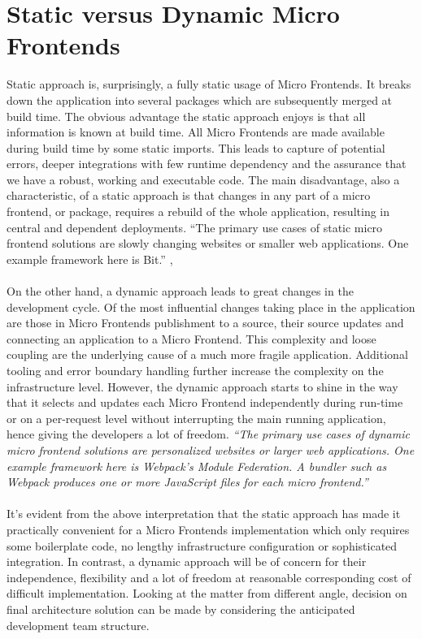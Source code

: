 \documentclass[a4paper]{book}
\begin{document}
\section{Static versus Dynamic Micro Frontends}
Static approach is, surprisingly, a fully static usage of Micro Frontends. It breaks down the application into several packages which are subsequently merged at build time. The obvious advantage the static approach enjoys is that all information is known at build time. All Micro Frontends are made available during build time by some static imports. This leads to capture of potential errors, deeper integrations with few runtime dependency and the assurance that we have a robust, working and executable code. The main disadvantage, also a characteristic, of a static approach is that changes in any part of a micro frontend, or package, requires a rebuild of the whole application, resulting in central and dependent deployments. “The primary use cases of static micro frontend solutions are slowly changing websites or smaller web applications. One example framework here is Bit.” \cite{Rap20}, \cite{Bit15}
\\
\\
On the other hand, a dynamic approach leads to great changes in the development cycle. Of the most influential changes taking place in the application are those in Micro Frontends publishment to a source, their source updates and connecting an application to a Micro Frontend. This complexity and loose coupling are the underlying cause of a much more fragile application. Additional tooling and error boundary handling further increase the complexity on the infrastructure level. However, the dynamic approach starts to shine in the way that it selects and updates each Micro Frontend independently during run-time or on a per-request level without interrupting the main running application, hence giving the developers a lot of freedom. \textit{“The primary use cases of dynamic micro frontend solutions are personalized websites or larger web applications. One example framework here is Webpack's Module Federation. A bundler such as Webpack produces one or more JavaScript files for each micro frontend.”} \cite{Rap20} \cite{Webpack}
\\
\\
It’s evident from the above interpretation that the static approach has made it practically convenient for a Micro Frontends implementation which only requires some boilerplate code, no lengthy infrastructure configuration or sophisticated integration. In contrast, a dynamic approach will be of concern for their independence, flexibility and a lot of freedom at reasonable corresponding cost of difficult implementation. 
Looking at the matter from different angle, decision on final architecture solution can be made by considering the anticipated development team structure.
\end{document}
